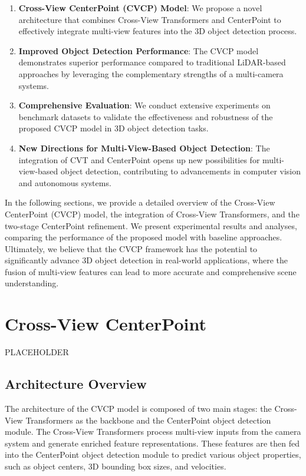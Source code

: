 \documentclass[times, report, parskip, openbib, twocolumn]{article}
\begin{document}
\begin{enumerate}
    \item \textbf{Cross-View CenterPoint (CVCP) Model}: We propose a novel architecture that combines Cross-View Transformers and CenterPoint to effectively integrate multi-view features into the 3D object detection process.
    \item \textbf{Improved Object Detection Performance}: The CVCP model demonstrates superior performance compared to traditional LiDAR-based approaches by leveraging the complementary strengths of a multi-camera systems.
    \item \textbf{Comprehensive Evaluation}: We conduct extensive experiments on benchmark datasets to validate the effectiveness and robustness of the proposed CVCP model in 3D object detection tasks.
    \item \textbf{New Directions for Multi-View-Based Object Detection}: The integration of CVT and CenterPoint opens up new possibilities for multi-view-based object detection, contributing to advancements in computer vision and autonomous systems.
\end{enumerate}

In the following sections, we provide a detailed overview of the Cross-View CenterPoint (CVCP) model, the integration of Cross-View Transformers, and the two-stage CenterPoint refinement. We present experimental results and analyses, comparing the performance of the proposed model with baseline approaches. Ultimately, we believe that the CVCP framework has the potential to significantly advance 3D object detection in real-world applications, where the fusion of multi-view features can lead to more accurate and comprehensive scene understanding.

\section{Cross-View CenterPoint}
\label{sec:proposed_model}

PLACEHOLDER

\subsection{Architecture Overview}
\label{subsec:architecture_overview}

The architecture of the CVCP model is composed of two main stages: the Cross-View Transformers as the backbone and the CenterPoint object detection module. The Cross-View Transformers process multi-view inputs from the camera system and generate enriched feature representations. These features are then fed into the CenterPoint object detection module to predict various object properties, such as object centers, 3D bounding box sizes, and velocities.
\end{document}
